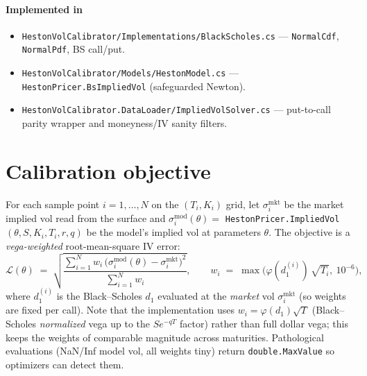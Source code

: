\documentclass[11pt,a4paper]{article}
\begin{document}
\paragraph*{Implemented in}
\begin{itemize}
\item \texttt{HestonVolCalibrator/Implementations/BlackScholes.cs} --- \texttt{NormalCdf}, \texttt{NormalPdf}, BS call/put.
\item \texttt{HestonVolCalibrator/Models/HestonModel.cs} --- \texttt{HestonPricer.BsImpliedVol} (safeguarded Newton).
\item \texttt{HestonVolCalibrator.DataLoader/ImpliedVolSolver.cs} --- put-to-call parity wrapper and moneyness/IV sanity filters.
\end{itemize}

\section{Calibration objective}
\label{sec:objective}
For each sample point $i = 1,\dots, N$ on the $(T_i, K_i)$ grid, let
$\sigma^{\mathrm{mkt}}_i$ be the market implied vol read from the surface and
$\sigma^{\mathrm{mod}}_i(\theta) = $ \texttt{HestonPricer.ImpliedVol}$(\theta, S, K_i, T_i, r, q)$
be the model's implied vol at parameters $\theta$. The objective is a
\emph{vega-weighted} root-mean-square IV error:
\[
\mathcal{L}(\theta) \;=\;
\sqrt{\frac{\sum_{i=1}^N w_i\,\big(\sigma^{\mathrm{mod}}_i(\theta) - \sigma^{\mathrm{mkt}}_i\big)^2}{\sum_{i=1}^N w_i}},
\qquad
w_i \;=\; \max\!\Big(\varphi(d^{(i)}_1)\,\sqrt{T_i},\ 10^{-6}\Big),
\]
where $d^{(i)}_1$ is the Black--Scholes $d_1$ evaluated at the \emph{market} vol
$\sigma^{\mathrm{mkt}}_i$ (so weights are fixed per call). Note that the implementation
uses $w_i = \varphi(d_1)\sqrt{T}$ (Black--Scholes \emph{normalized} vega up to the $S e^{-qT}$
factor) rather than full dollar vega; this keeps the weights of comparable magnitude
across maturities. Pathological evaluations (NaN/Inf model vol, all weights tiny)
return \texttt{double.MaxValue} so optimizers can detect them.
\end{document}
